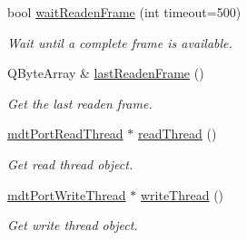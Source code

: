 \begin{DoxyCompactItemize}
bool \hyperlink{classmdt_port_manager_a44ca338c8c56893612301e09d2ee6e88}{waitReadenFrame} (int timeout=500)
\begin{DoxyCompactList}\small\item\em Wait until a complete frame is available. \end{DoxyCompactList}\item 
\hypertarget{classmdt_port_manager_ac289078134036e05eaa3eabc6799443a}{
QByteArray \& \hyperlink{classmdt_port_manager_ac289078134036e05eaa3eabc6799443a}{lastReadenFrame} ()}
\label{classmdt_port_manager_ac289078134036e05eaa3eabc6799443a}

\begin{DoxyCompactList}\small\item\em Get the last readen frame. \end{DoxyCompactList}\item 
\hyperlink{classmdt_port_read_thread}{mdtPortReadThread} $\ast$ \hyperlink{classmdt_port_manager_adb7669da204438b7b802c8efad422a71}{readThread} ()
\begin{DoxyCompactList}\small\item\em Get read thread object. \end{DoxyCompactList}\item 
\hyperlink{classmdt_port_write_thread}{mdtPortWriteThread} $\ast$ \hyperlink{classmdt_port_manager_aeac5a4abfd2a2f4e4ecb608ca9d38fcf}{writeThread} ()
\begin{DoxyCompactList}\small\item\em Get write thread object. \end{DoxyCompactList}\end{DoxyCompactItemize}
